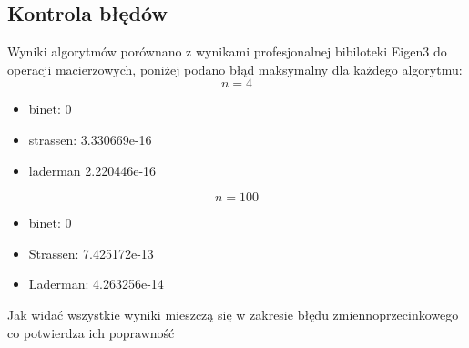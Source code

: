 \documentclass[twoside]{article}
\begin{document}
\subsection{Kontrola błędów}
Wyniki algorytmów porównano z wynikami profesjonalnej bibiloteki Eigen3 do operacji macierzowych, poniżej podano błąd maksymalny dla każdego algorytmu:
\[n = 4 \]
\begin{itemize}
  \item binet: 0
  \item strassen: 3.330669e-16
  \item laderman 2.220446e-16
\end{itemize}

\[n = 100 \]
\begin{itemize}
  \item binet: 0
  \item Strassen: 7.425172e-13
  \item Laderman: 4.263256e-14
\end{itemize}

Jak widać wszystkie wyniki mieszczą się w zakresie błędu zmiennoprzecinkowego co potwierdza ich poprawność
\end{document}
